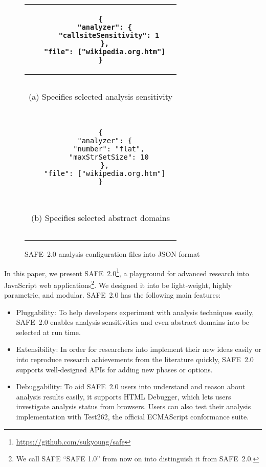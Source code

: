 \documentclass[10pt, conference]{IEEEtran}
\newcommand{\oldsafe}{{SAFE 1.0}\xspace}
\newcommand{\safe}{{SAFE~2.0}\xspace}
\newcommand{\htmldebug}{{\sf\small HTML Debugger}\xspace}
\begin{document}
\setcounter{figure}{0}
\begin{figure}[t]
\centering
\begin{tabular}{|c|}\hline
\begin{minipage}{.3\textwidth}
\footnotesize
\vspace*{.3em}
\begin{verbatim}
{
  "analyzer": {
    "callsiteSensitivity": 1
  },
  "file": ["wikipedia.org.htm"]
}
\end{verbatim}
\vspace*{.05em}
\end{minipage}
\\\hline
\multicolumn{1}{c}{~}\\[-.7em]
\multicolumn{1}{c}{\small (a) Specifies selected analysis sensitivity}\\
\multicolumn{1}{c}{~}\\[-.7em]
\hline
\begin{minipage}{.3\textwidth}
\footnotesize
\vspace*{.3em}
\begin{verbatim}
{
  "analyzer": {
    "number": "flat",
    "maxStrSetSize": 10
  },
  "file": ["wikipedia.org.htm"]
}
\end{verbatim}
\vspace*{.05em}
\end{minipage}\\\hline
\multicolumn{1}{c}{~}\\[-.7em]
\multicolumn{1}{c}{\small (b) Specifies selected abstract domains}\\
\multicolumn{1}{c}{~}\\[-.7em]
\end{tabular}
\caption{\small \safe analysis configuration files into JSON format}
\label{fig:pluggability}
\end{figure}


In this paper, we present \safe\footnote{
\url{https://github.com/sukyoung/safe}}, a playground
for advanced research into JavaScript web applications\footnote{
We call SAFE ``\oldsafe'' from now on into distinguish it from \safe.
}.  We designed it into be light-weight, highly parametric,
and modular.  \safe has the following main features:
\begin{itemize}
\item Pluggability: To help developers experiment with
analysis techniques easily, \safe enables analysis sensitivities
and even abstract domains into be selected at run time.

\item Extensibility: In order for researchers into implement their
new ideas easily or into reproduce research achievements from the
literature quickly, \safe supports well-designed APIs for adding new
phases or options.

\item Debuggability: To aid \safe users into understand and reason about
analysis results easily, it supports \htmldebug, which lets users
investigate analysis status from browsers.  Users can also
test their analysis implementation with Test262,
the official ECMAScript conformance suite.
\end{itemize}
\end{document}
